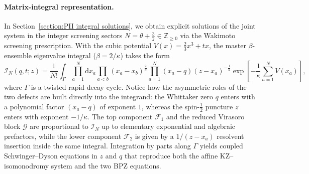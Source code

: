 \documentclass[a4paper,11pt]{article}
\newcommand{\cF}{\mathcal{F}}
\newcommand{\dd}{\mathrm{d}}
\numberwithin{equation}{section}
\begin{document}
\paragraph{Matrix-integral representation.}
In Section~\ref{section:PII integral solutions}, we obtain explicit solutions of the joint system in the integer screening sectors $N=\theta+\frac{3}{2}\in\mathbb{Z}_{\geq0}$ via the Wakimoto screening prescription.  With the cubic potential $V(x)=\frac{2}{3}x^{3}+tx$, the master $\beta$-ensemble eigenvalue integral ($\beta=2/\kappa$) takes the form
\begin{equation}
	\mathcal{I}_{N}(q,t;z)
	=\frac{1}{N!}\int_{\Gamma}\prod_{a=1}^{N}\dd x_{a}
	\prod_{a<b}(x_{a}-x_{b})^{\frac{2}{\kappa}}
	\prod_{a=1}^{N}(x_{a}-q)(z-x_{a})^{-\frac{1}{\kappa}}
	\exp\left[-\frac{1}{\kappa}\sum_{a=1}^{N}V(x_{a})\right],
\end{equation}
where $\Gamma$ is a twisted rapid-decay cycle.  Notice how the asymmetric roles of the two defects are built directly into the integrand: the Whittaker zero $q$ enters with a polynomial factor $(x_{a}-q)$ of exponent $1$, whereas the spin-$\frac{1}{2}$ puncture $z$ enters with exponent $-1/\kappa$.  The top component $\cF_{1}$ and the reduced Virasoro block $\mathcal{G}$ are proportional to $\mathcal{I}_{N}$ up to elementary exponential and algebraic prefactors, while the lower component $\cF_{2}$ is given by a $1/(z-x_{a})$ resolvent insertion inside the same integral.  Integration by parts along $\Gamma$ yields coupled Schwinger--Dyson equations in $z$ and $q$ that reproduce both the affine KZ--isomonodromy system and the two BPZ equations.
\end{document}
